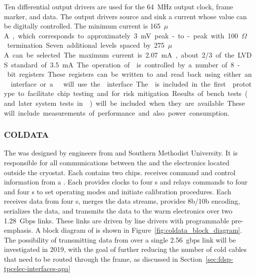 Ten differential output drivers are used for the \SI{64}{MHz} output clock, frame
marker, and  data.  The output drivers source and sink a current whose
value can be digitally controlled.  The minimum current is \SI{165}{$\mu$A},
which corresponds to approximately \SI{3}{mV} peak-to-peak with \SI{100}{$\Omega$}
termination.  Seven additional levels spaced by \SI{275}{$\mu$A} can be selected.
The maximum current is \SI{2.07}{mA}, about \num{2/3} of the LVDS standard of
\SI{3.5}{mA}.

The operation of  is controlled by a number of \num{8}-bit registers.
These registers can be written to and read back using either an 
interface or a .  will use the  interface.  The
 is included in the first  prototype to facilitate chip testing
and for risk mitigation.

Results of bench tests (and later system tests in ) will be included
when they are available.  These will include measurements of performance and
also power consumption.

\subsubsection{COLDATA }
\label{sec:fdsp-tpcelec-design-femb-coldata}

The   was designed by engineers from  
and Southern Methodist University. It is responsible for all communications 
between the  and the electronics located outside the cryostat. 
Each  contains two  chips.  receives 
command and control information from a . Each  provides 
clocks to four s and relays commands to four  
  and four s to set operating modes and 
initiate calibration procedures.  Each  receives data from four 
s, merges the data streams, provides 8b/10b encoding, serializes 
the data, and transmits the data to the warm electronics over two \SI{1.28}{Gbps} 
links.  These links are driven by line drivers with programmable pre-emphasis. 
A block diagram of  is shown in Figure~\ref{fig:coldata_block_diagram}.
The possibility of transmitting data from  over a single 
\SI{2.56}{gbps} link will be investigated in 2019, with the goal of further
reducing the number of cold cables that need to be routed through the
 frame, as discussed in Section~\ref{sec:fdsp-tpcelec-interfaces-apa}


